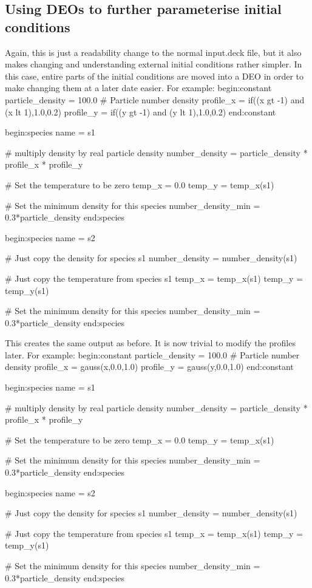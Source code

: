\documentclass[12pt,a4paper]{article}
\newenvironment{boxverbatim}{\lboxverbatim{none}}{\endlboxverbatim}
\begin{document}
\subsection{Using DEOs to further parameterise initial conditions}
Again, this is just a readability change to the normal input.deck file, but it
also makes changing and understanding external initial conditions rather
simpler. In this case, entire parts of the initial conditions are moved into a
DEO in order to make changing them at a later date easier. For example:
\begin{boxverbatim}
begin:constant
   particle_density = 100.0 # Particle number density
   profile_x = if((x gt -1) and (x lt 1),1.0,0.2)
   profile_y = if((y gt -1) and (y lt 1),1.0,0.2)
end:constant

begin:species
   name = s1

   # multiply density by real particle density
   number_density = particle_density * profile_x * profile_y

   # Set the temperature to be zero
   temp_x = 0.0
   temp_y = temp_x(s1)

   # Set the minimum density for this species
   number_density_min = 0.3*particle_density
end:species

begin:species
   name = s2

   # Just copy the density for species s1
   number_density = number_density(s1)

   # Just copy the temperature from species s1
   temp_x = temp_x(s1)
   temp_y = temp_y(s1)

   # Set the minimum density for this species
   number_density_min = 0.3*particle_density
end:species
\end{boxverbatim}

This creates the same output as before. It is now trivial to modify the
profiles later. For example:
\begin{boxverbatim}
begin:constant
   particle_density = 100.0 # Particle number density
   profile_x = gauss(x,0.0,1.0)
   profile_y = gauss(y,0.0,1.0)
end:constant

begin:species
   name = s1

   # multiply density by real particle density
   number_density = particle_density * profile_x * profile_y

   # Set the temperature to be zero
   temp_x = 0.0
   temp_y = temp_x(s1)

   # Set the minimum density for this species
   number_density_min = 0.3*particle_density
end:species

begin:species
   name = s2

   # Just copy the density for species s1
   number_density = number_density(s1)

   # Just copy the temperature from species s1
   temp_x = temp_x(s1)
   temp_y = temp_y(s1)

   # Set the minimum density for this species
   number_density_min = 0.3*particle_density
end:species
\end{boxverbatim}
\end{document}
